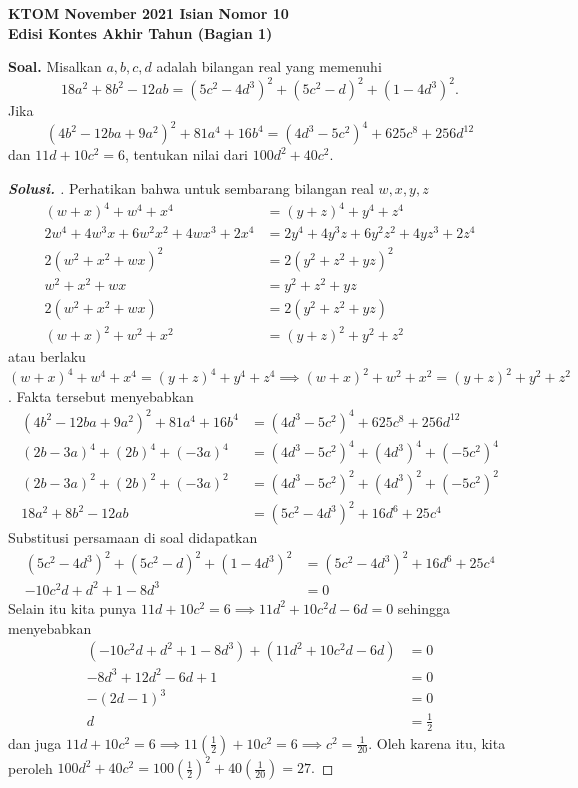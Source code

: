 \begin{center}
    \textbf{\Huge KTOM November 2021 Isian Nomor 10}\\
    \textbf{\large Edisi Kontes Akhir Tahun (Bagian 1)}
\end{center}


	\vspace{-1cm}
  \textbf{Soal.} Misalkan $a,b,c,d$ adalah bilangan real yang memenuhi $$18a^2+8b^2-12ab = (5c^2-4d^3)^2+(5c^2-d)^2+(1-4d^3)^2.$$ Jika $$(4b^2-12ba+9a^2)^2+81a^4+16b^4=(4d^3-5c^2)^4+625c^8+256d^{12}$$ dan $11d+10c^2=6$, tentukan nilai dari $100d^2+40c^2$.
  
  \begin{proof}[\textbf{Solusi. }]
  Perhatikan bahwa untuk sembarang bilangan real $w,x,y,z$
  \begin{align*}
  (w+x)^4+w^4+x^4&=(y+z)^4+y^4+z^4\\
  2w^4+4w^3x+6w^2x^2+4wx^3+2x^4 &= 2y^4+4y^3z+6y^2z^2+4yz^3+2z^4\\
  2(w^2+x^2+wx)^2 &= 2(y^2+z^2+yz)^2\\
  w^2+x^2+wx &= y^2+z^2+yz\\
  2(w^2+x^2+wx) &= 2(y^2+z^2+yz)\\
  (w+x)^2+w^2+x^2 &= (y+z)^2+y^2+z^2
  \end{align*}
  atau berlaku $(w+x)^4+w^4+x^4=(y+z)^4+y^4+z^4 \implies (w+x)^2+w^2+x^2 = (y+z)^2+y^2+z^2$.
  Fakta tersebut menyebabkan
  \begin{align*}
  (4b^2-12ba+9a^2)^2+81a^4+16b^4&=(4d^3-5c^2)^4+625c^8+256d^{12}\\
  (2b-3a)^4+(2b)^4+(-3a)^4&=(4d^3-5c^2)^4+(4d^3)^4+(-5c^2)^4\\
  (2b-3a)^2+(2b)^2+(-3a)^2&=(4d^3-5c^2)^2+(4d^3)^2+(-5c^2)^2\\
  18a^2+8b^2-12ab &= (5c^2-4d^3)^2+16d^6+25c^4
  \end{align*}
  Substitusi persamaan  di soal didapatkan
  \begin{align*}
  (5c^2-4d^3)^2+(5c^2-d)^2+(1-4d^3)^2 &= (5c^2-4d^3)^2+16d^6+25c^4\\
  -10c^2d+d^2+1-8d^3 &= 0
  \end{align*}
  Selain itu kita punya 
  $11d+10c^2=6 \implies 11d^2+10c^2d-6d=0$ sehingga menyebabkan 
  \begin{align*}
  (-10c^2d+d^2+1-8d^3)+(11d^2+10c^2d-6d)&=0\\
  -8d^3+12d^2-6d+1&=0\\
  -(2d-1)^3&=0\\
  d&=\frac{1}{2}
  \end{align*}
  dan juga
  $11d+10c^2=6 \implies 11(\frac{1}{2})+10c^2=6 \implies c^2=\frac{1}{20}.$
  Oleh karena itu, kita peroleh $100d^2+40c^2=100(\frac{1}{2})^2+40(\frac{1}{20})=\boxed{27}.$
  
  \end{proof}
